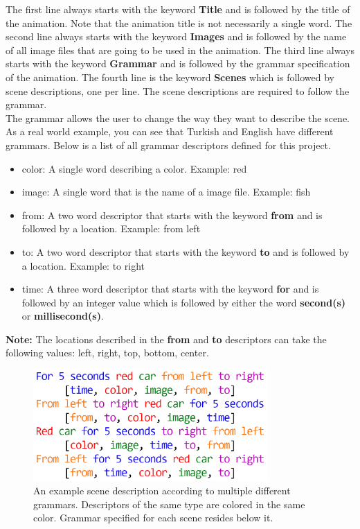 \documentclass[a4paper]{article}
\begin{document}
	
	The first line always starts with the keyword \textbf{Title} and is followed by the title of the animation. Note that the animation title is not necessarily a single word. The second line always starts with the keyword \textbf{Images} and is followed by the name of all image files that are going to be used in the animation. The third line always starts with the keyword \textbf{Grammar} and is followed by the grammar specification of the animation. The fourth line is the keyword \textbf{Scenes} which is followed by scene descriptions, one per line. The scene descriptions are required to follow the grammar.\\
	
	The grammar allows the user to change the way they want to describe the scene. As a real world example, you can see that Turkish and English have different grammars. Below is a list of all grammar descriptors defined for this project.
	\label{grammar}
	\begin{itemize}
		\item color: A single word describing a color. Example: red
		\item image: A single word that is the name of a image file. Example: fish
		\item from: A two word descriptor that starts with the keyword \textbf{from} and is followed by a location. Example: from left
		\item to: A two word descriptor that starts with the keyword \textbf{to} and is followed by a location. Example: to right
		\item time: A three word descriptor that starts with the keyword \textbf{for} and is followed by an integer value which is followed by either the word \textbf{second(s)} or \textbf{millisecond(s)}.
	\end{itemize}

	\noindent \textbf{Note:} The locations described in the \textbf{from} and \textbf{to} descriptors can take the following values: left, right, top, bottom, center.
	
	\begin{figure}[!htb]
		\centering
		\includegraphics[width=0.8\textwidth]{../img/example_grammar.png}
		\caption{An example scene description according to multiple different grammars. Descriptors of the same type are colored in the same color. Grammar specified for each scene resides below it.}
	\end{figure}
	
\end{document}
